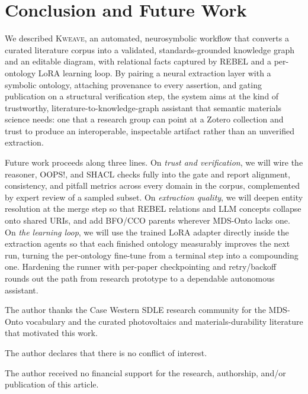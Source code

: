 \documentclass[Afour,sageh,times]{sagej}
\begin{document}
\section{Conclusion and Future Work}
We described \textsc{Kweave}, an automated, neurosymbolic workflow that converts a curated literature
corpus into a validated, standards-grounded knowledge graph and an editable diagram, with relational
facts captured by REBEL and a per-ontology LoRA learning loop. By pairing a neural extraction layer with
a symbolic ontology, attaching provenance to every assertion, and gating publication on a structural
verification step, the system aims at the kind of trustworthy, literature-to-knowledge-graph assistant
that semantic materials science needs: one that a research group can point at a Zotero collection and
trust to produce an interoperable, inspectable artifact rather than an unverified extraction.

Future work proceeds along three lines. On \emph{trust and verification}, we will wire the reasoner,
OOPS!, and SHACL checks fully into the gate and report alignment, consistency, and pitfall metrics
across every domain in the corpus, complemented by expert review of a sampled subset. On
\emph{extraction quality}, we will deepen entity resolution at the merge step so that REBEL relations
and LLM concepts collapse onto shared URIs, and add BFO/CCO parents wherever MDS-Onto lacks one. On
\emph{the learning loop}, we will use the trained LoRA adapter directly inside the extraction agents so
that each finished ontology measurably improves the next run, turning the per-ontology fine-tune from a
terminal step into a compounding one. Hardening the runner with per-paper checkpointing and
retry/backoff rounds out the path from research prototype to a dependable autonomous assistant.

\begin{acks}
The author thanks the Case Western SDLE research community for the MDS-Onto vocabulary and the
curated photovoltaics and materials-durability literature that motivated this work.
\end{acks}

\begin{dci}
The author declares that there is no conflict of interest.
\end{dci}

\begin{funding}
The author received no financial support for the research, authorship, and/or publication of this
article.
\end{funding}
\end{document}

